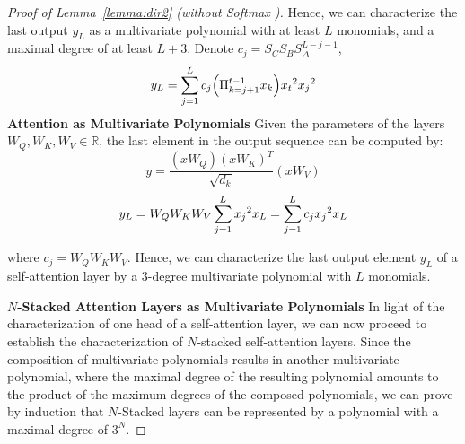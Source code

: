 \begin{proof}[Proof of Lemma~\ref{lemma:dir2} (without Softmax%
)]
Hence, we can characterize the last output $y_L$ as a multivariate polynomial with at least $L$ monomials, and a maximal degree of at least $L+3$. Denote $c_j = S_C S_B S_{\Delta}^{L-j-1}$,%
\vspace{-5pt}
\begin{equation}\label{eq:SimpleMamba1Chan}
    y_L = \sum_{j=1}^L c_j \Big{(} \Pi_{k=j+1}^{t-1} x_k \Big{)} {x_t}^2 {x_j}^2 %
\end{equation}
\noindent\textbf{Attention as Multivariate Polynomials\quad}
Given the parameters of the layers $W_Q, W_K, W_V \in \mathbb{R}$, the last element in the output sequence can be computed by:
\vspace{-5pt}
{\small
\begin{equation}
y=\frac{(x W_{Q}) (x  W_{K})^T}{\sqrt{d_k}} (x W_{V})%
\end{equation}
}
\vspace{-5pt}
{\small
\begin{equation}
\small
y_L = W_Q W_K W_V \sum_{j=1}^L  {x_j}^2 x_L = \sum_{j=1}^L c_j{x_j}^2 x_L 
\vspace{-3pt}
\end{equation}
}

where $c_j = W_Q W_K W_V$. Hence, we can characterize the last output element $y_L$ of a self-attention layer by a 3-degree multivariate polynomial with $L$ monomials.%

\noindent\textbf{$N$-Stacked Attention Layers as Multivariate Polynomials\quad}
In light of the characterization of one head of a self-attention layer, we can now proceed to establish the characterization of $N$-stacked self-attention layers. Since the composition of multivariate polynomials results in another multivariate polynomial, where the maximal degree of the resulting polynomial amounts to the product of the maximum degrees of the composed polynomials, we can prove by induction that $N$-Stacked layers can be represented by a polynomial with a maximal degree of $3^N$.


\end{proof}
